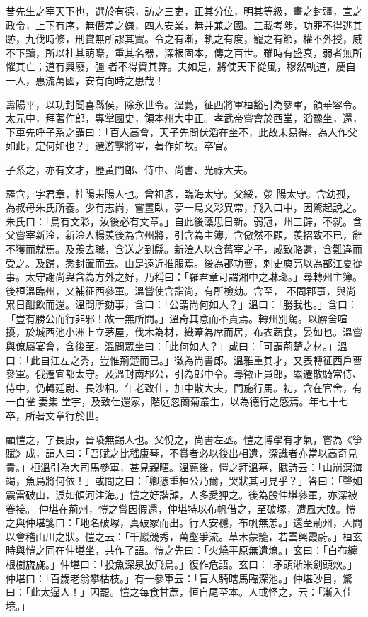 \begin{pinyinscope}
 昔先生之宰天下也，選於有德，訪之三吏，正其分位，明其等級，畫之封疆，宣之政令，上下有序，無僭差之嫌，四人安業，無并兼之國。三載考陟，功罪不得逃其跡，九伐時修，刑賞無所謬其實。令之有漸，軌之有度，寵之有節，權不外授，威不下黷，所以杜其萌際，重其名器，深根固本，傳之百世。雖時有盛衰，弱者無所懼其亡；道有興廢，彊
 者不得資其弊。夫如是，將使天下從風，穆然軌道，慶自一人，惠流萬國，安有向時之患哉！



 壽陽平，以功封聞喜縣侯，除永世令。溫薨，征西將軍桓豁引為參軍，領華容令。太元中，拜著作郎，專掌國史，領本州大中正。孝武帝嘗會於西堂，滔豫坐，還，下車先呼子系之謂曰：「百人高會，天子先問伏滔在坐不，此故未易得。為人作父如此，定何如也？」遷游擊將軍，著作如故。卒官。



 子系之，亦有文才，歷黃門郎、侍中、尚書、光祿大夫。



 羅含，字君章，桂陽耒陽人也。曾祖彥，臨海太守。父綏，滎
 陽太守。含幼孤，為叔母朱氏所養。少有志尚，嘗晝臥，夢一鳥文彩異常，飛入口中，因驚起說之。朱氏曰：「鳥有文彩，汝後必有文章。」自此後藻思日新。弱冠，州三辟，不就。含父嘗宰新淦，新淦人楊羨後為含州將，引含為主簿，含傲然不顧，羨招致不已，辭不獲而就焉。及羨去職，含送之到縣。新淦人以含舊宰之子，咸致賂遺，含難違而受之。及歸，悉封置而去。由是遠近推服焉。後為郡功曹，刺史庾亮以為部江夏從事。太守謝尚與含為方外之好，乃稱曰：「羅君章可謂湘中之琳瑯。」尋轉州主簿。後桓溫臨州，又補征西參軍。溫嘗使含詣尚，有所檢劾。含至，
 不問郡事，與尚累日酣飲而還。溫問所劾事，含曰：「公謂尚何如人？」溫曰：「勝我也。」含曰：「豈有勝公而行非邪！故一無所問。」溫奇其意而不責焉。轉州別駕。以廨舍喧擾，於城西池小洲上立茅屋，伐木為材，織葦為席而居，布衣蔬食，晏如也。溫嘗與僚屬宴會，含後至。溫問眾坐曰：「此何如人？」或曰：「可謂荊楚之材。」溫曰：「此自江左之秀，豈惟荊楚而已。」徵為尚書郎。溫雅重其才，又表轉征西戶曹參軍。俄遷宜都太守。及溫封南郡公，引為郎中令。尋徵正員郎，累遷散騎常侍、侍中，仍轉廷尉、長沙相。年老致仕，加中散大夫，門施行馬。初，含在官舍，有一白雀妻集
 堂宇，及致仕還家，階庭忽蘭菊叢生，以為德行之感焉。年七十七卒，所著文章行於世。



 顧愷之，字長康，晉陵無錫人也。父悅之，尚書左丞。愷之博學有才氣，嘗為《箏賦》成，謂人曰：「吾賦之比嵇康琴，不賞者必以後出相遺，深識者亦當以高奇見貴。」桓溫引為大司馬參軍，甚見親暱。溫薨後，愷之拜溫墓，賦詩云：「山崩溟海竭，魚鳥將何依！」或問之曰：「卿憑重桓公乃爾，哭狀其可見乎？」答曰：「聲如震雷破山，淚如傾河注海。」愷之好諧謔，人多愛狎之。後為殷仲堪參軍，亦深被眷接。
 仲堪在荊州，愷之嘗因假還，仲堪特以布帆借之，至破塚，遭風大敗。愷之與仲堪箋曰：「地名破塚，真破冢而出。行人安穩，布帆無恙。」還至荊州，人問以會稽山川之狀。愷之云：「千巖競秀，萬壑爭流。草木蒙籠，若雲興霞蔚。」桓玄時與愷之同在仲堪坐，共作了語。愷之先曰：「火燒平原無遺燎。」玄曰：「白布纏根樹旒旐。」仲堪曰：「投魚深泉放飛鳥。」復作危語。玄曰：「矛頭淅米劍頭炊。」仲堪曰：「百歲老翁攀枯枝。」有一參軍云：「盲人騎瞎馬臨深池。」仲堪眇目，驚曰：「此太逼人！」因罷。愷之每食甘蔗，恒自尾至本。人或怪之，云：「漸入佳境。」




\end{pinyinscope}
